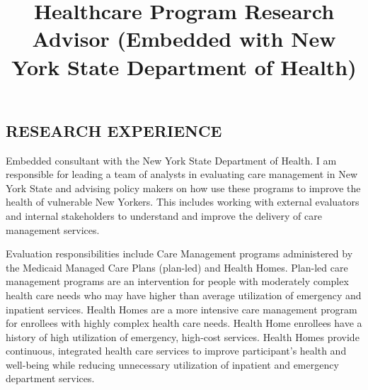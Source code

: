 \documentclass[line, margin, 10pt]{res}
\begin{document}
 

\address{andy.choens@gmail.com  (518) 275 - 5984}
\address{(518) 275 - 5984}

\begin{resume}


  \section{RESEARCH EXPERIENCE}


  \title{Healthcare Program Research Advisor (Embedded with New York
    State Department of Health)}
  \begin{position}
    Embedded consultant with the New York State Department of
    Health. I am responsible for leading a team of analysts in
    evaluating care management in New York State and advising policy
    makers on how use these programs to improve the health of
    vulnerable New Yorkers. This includes working with external
    evaluators and internal stakeholders to understand and improve the
    delivery of care management services.

    Evaluation responsibilities include Care Management programs
    administered by the Medicaid Managed Care Plans (plan-led) and
    Health Homes. Plan-led care management programs are an
    intervention for people with moderately complex health care needs
    who may have higher than average utilization of emergency and
    inpatient services. Health Homes are a more intensive care
    management program for enrollees with highly complex health care
    needs. Health Home enrollees have a history of high utilization of
    emergency, high-cost services. Health Homes provide continuous,
    integrated health care services to improve participant’s health
    and well-being while reducing unnecessary utilization of inpatient
    and emergency department services.


\end{position}
\end{resume}
\end{document}
